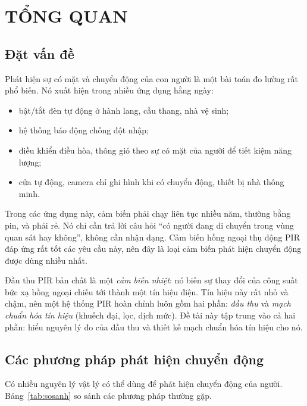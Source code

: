 \chapter{TỔNG QUAN}
\label{chap:tongquan}

\section{Đặt vấn đề}

Phát hiện sự có mặt và chuyển động của con người là một bài toán đo lường rất phổ biến. Nó xuất hiện trong nhiều ứng dụng hằng ngày:
\begin{itemize}
  \item bật/tắt đèn tự động ở hành lang, cầu thang, nhà vệ sinh;
  \item hệ thống báo động chống đột nhập;
  \item điều khiển điều hòa, thông gió theo sự có mặt của người để tiết kiệm năng lượng;
  \item cửa tự động, camera chỉ ghi hình khi có chuyển động, thiết bị nhà thông minh.
\end{itemize}

Trong các ứng dụng này, cảm biến phải chạy liên tục nhiều năm, thường bằng pin, và phải rẻ. Nó chỉ cần trả lời câu hỏi ``có người đang di chuyển trong vùng quan sát hay không'', không cần nhận dạng. Cảm biến hồng ngoại thụ động PIR đáp ứng rất tốt các yêu cầu này, nên đây là loại cảm biến phát hiện chuyển động được dùng nhiều nhất.

Đầu thu PIR bản chất là một \emph{cảm biến nhiệt}: nó biến sự thay đổi của công suất bức xạ hồng ngoại chiếu tới thành một tín hiệu điện. Tín hiệu này rất nhỏ và chậm, nên một hệ thống PIR hoàn chỉnh luôn gồm hai phần: \emph{đầu thu} và \emph{mạch chuẩn hóa tín hiệu} (khuếch đại, lọc, dịch mức). Đề tài này tập trung vào cả hai phần: hiểu nguyên lý đo của đầu thu \PYD{} và thiết kế mạch chuẩn hóa tín hiệu cho nó.

\section{Các phương pháp phát hiện chuyển động}

Có nhiều nguyên lý vật lý có thể dùng để phát hiện chuyển động của người. Bảng~\ref{tab:sosanh} so sánh các phương pháp thường gặp.

